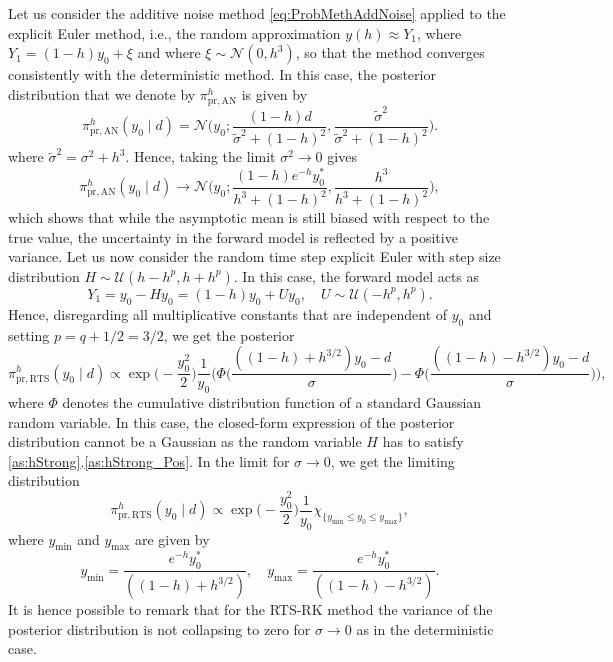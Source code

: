 \documentclass[final,onefignum,onetabnum]{siamonline171218}
\begin{document}
Let us consider the additive noise method \eqref{eq:ProbMethAddNoise} applied to the explicit Euler method, i.e., the random approximation $y(h) \approx Y_1$, where $Y_1 = (1 - h)y_0 + \xi$ and where $\xi \sim \mathcal N(0, h^3)$, so that the method converges consistently with the deterministic method. In this case, the posterior distribution that we denote by $\pi^h_{\mathrm{pr, AN}}$ is given by
\begin{equation}
\pi^h_{\mathrm{pr, AN}}(y_0 \mid d) = \mathcal N\Big(y_0; \frac{(1 - h)d}{\tilde \sigma^2 + (1- h)^2}, \frac{\tilde \sigma^2}{\tilde \sigma^2 + (1 - h)^2}\Big).
\end{equation}
where $\tilde \sigma^2 = \sigma^2 + h^3$. Hence, taking the limit $\sigma^2 \to 0$ gives
\begin{equation}\label{eq:ExPosteriorAN}
\pi^h_{\mathrm{pr, AN}}(y_0 \mid d) \to \mathcal N\Big(y_0; \frac{(1 - h)e^{-h}y_0^*}{h^3 + (1 - h)^2}, \frac{h^3}{h^3 + (1 - h)^2}\Big),
\end{equation}
which shows that while the asymptotic mean is still biased with respect to the true value, the uncertainty in the forward model is reflected by a positive variance.
Let us now consider the random time step explicit Euler with step size distribution $H \sim \mathcal U(h - h^p, h + h^p)$. In this case, the forward model acts as
\begin{equation}
Y_1 = y_0 - H y_0 = (1 - h)y_0 + U y_0, \quad U \sim \mathcal U (-h^p, h^p).
\end{equation}
Hence, disregarding all multiplicative constants that are independent of $y_0$ and setting $p = q + 1/2 = 3/2$, we get the posterior
\begin{equation}\label{eq:ExPosteriorRTS}
\pi^h_{\mathrm{pr, RTS}}(y_0 \mid d) \propto \exp\Big(-\frac{y_0^2}{2}\Big) \frac{1}{y_0} \Big(\Phi\Big(\frac{((1 - h) + h^{3/2})y_0 - d}{\sigma}\Big) - \Phi\Big(\frac{((1 - h) - h^{3/2})y_0 - d}{\sigma}\Big) \Big),
\end{equation}
where $\Phi$ denotes the cumulative distribution function of a standard Gaussian random variable. In this case, the closed-form expression of the posterior distribution cannot be a Gaussian as the random variable $H$ has to satisfy \cref{as:hStrong}.\ref{as:hStrong_Pos}. In the limit for $\sigma \to 0$, we get the limiting distribution 
\begin{equation}
\pi^h_{\mathrm{pr, RTS}}(y_0 \mid d) \propto \exp\Big(-\frac{y_0^2}{2}\Big)\frac{1}{y_0} \chi_{\{y_{\min} \leq y_0 \leq y_{\max}\}},
\end{equation}
where $y_{\min}$ and $y_{\max}$ are given by
\begin{equation}
y_{\min} = \frac{e^{-h}y_0^*}{((1 - h) + h^{3/2})}, \quad y_{\max} = \frac{e^{-h}y_0^*}{((1 - h) - h^{3/2})}.
\end{equation}
It is hence possible to remark that for the RTS-RK method the variance of the posterior distribution is not collapsing to zero for $\sigma \to 0$ as in the deterministic case. 
\end{document}
